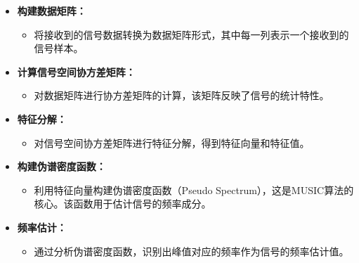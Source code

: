 \documentclass[a4paper,12pt]{article}
\begin{document}
\begin{itemize}
    \item \textbf{构建数据矩阵：}
    \begin{itemize}
        \item 将接收到的信号数据转换为数据矩阵形式，其中每一列表示一个接收到的信号样本。
    \end{itemize}
    
    \item \textbf{计算信号空间协方差矩阵：}
    \begin{itemize}
        \item 对数据矩阵进行协方差矩阵的计算，该矩阵反映了信号的统计特性。
    \end{itemize}
    
    \item \textbf{特征分解：}
    \begin{itemize}
        \item 对信号空间协方差矩阵进行特征分解，得到特征向量和特征值。
    \end{itemize}
    
    \item \textbf{构建伪谱密度函数：}
    \begin{itemize}
        \item 利用特征向量构建伪谱密度函数（Pseudo Spectrum），这是MUSIC算法的核心。该函数用于估计信号的频率成分。
    \end{itemize}
    
    \item \textbf{频率估计：}
    \begin{itemize}
        \item 通过分析伪谱密度函数，识别出峰值对应的频率作为信号的频率估计值。
    \end{itemize}
\end{itemize}
\end{document}
